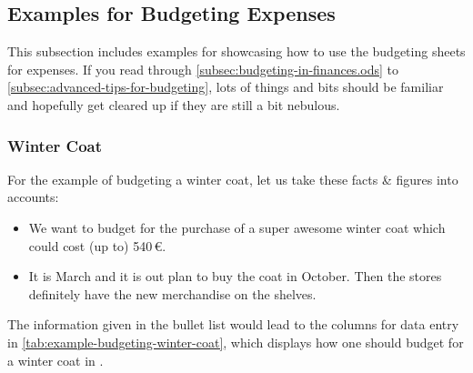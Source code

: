 \subsection{Examples for Budgeting Expenses}
\label{subsec:examples-budgeting-expenses}

This subsection includes examples for showcasing how to use the budgeting sheets for expenses.
If you read through \autoref{subsec:budgeting-in-finances.ods} to \autoref{subsec:advanced-tips-for-budgeting}, lots of things and bits should be familiar and hopefully get cleared up if they are still a bit nebulous.

\subsubsection{Winter Coat}
\label{subsubsec:example-budgeting-winter-coat}

For the example of budgeting a winter coat, let us take these facts \& figures into accounts:
\begin{itemize}
	\item We want to budget for the purchase of a super awesome winter coat which could cost (up to) 540\,€.
	\item It is March and it is out plan to buy the coat in October.
	Then the stores definitely have the new merchandise on the shelves.
\end{itemize}

The information given in the bullet list would lead to the columns for data entry in \autoref{tab:example-budgeting-winter-coat}, which displays how one should budget for a winter coat in \tfn.

